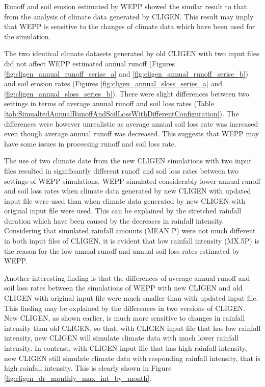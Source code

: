 Runoff and soil erosion estimated by WEPP showed the similar result to that from
the analysis of climate data generated by CLIGEN. This result may imply that
WEPP is sensitive to the changes of climate data which have been used for the
simulation.

The two identical climate datasets generated by old CLIGEN with two input files
did not affect WEPP estimated annual runoff (Figures
\ref{fig:cligen_annual_runoff_serise_a} and
\ref{fig:cligen_annual_runoff_serise_b}) and soil erosion rates (Figures
\ref{fig:cligen_annual_sloss_series_a} and
\ref{fig:cligen_annual_sloss_series_b}).
There were slight differences between two settings in terms of average annual
runoff and soil loss rates (Table
\ref{tab:SimualtedAnnualRunoffAndSoilLossWithDifferentConfiguration}). The
differences were however unrealistic as average annual soil loss rate was
increased even though average annual runoff was decreased. This suggests that
WEPP may have some issues in processing runoff and soil loss rate.

The use of two climate date from the new CLIGEN simulations with two input files
resulted in significantly different runoff and soil loss rates between two
settings of WEPP simulations. WEPP simulated considerably lower annual runoff
and soil loss rates when climate data generated by new CLIGEN with updated input
file were used than when climate data generated by new CLIGEN with original
input file were used. This can be explained by the stretched rainfall duration
which have been caused by the decreases in rainfall intensity. Considering that
simulated rainfall amounts (MEAN P) were not much different in both input files
of CLIGEN, it is evident that low rainfall intensity ({MX.5P}) is the reason for
the low annual runoff and annual soil loss rates estimated by WEPP.

Another interesting finding is that the differences of average annual runoff and
soil loss rates between the simulations of WEPP with new CLIGEN and old CLIGEN
with original input file were much smaller than with updated input file. This
finding may be explained by the differences in two versions of CLIGEN. New
CLIGEN, as shown earlier, is much more sensitive to changes in rainfall
intensity than old CLIGEN, so that, with CLIGEN input file that has low rainfall
intensity, new CLIGEN will simulate climate data with much lower rainfall
intensity. In contrast, with CLIGEN input file that has high rainfall intensity,
new CLIGEN still simulate climate data with responding rainfall intensity, that
is high rainfall intensity. This is clearly shown in Figure
\ref{fig:cligen_dr_monthly_max_int_by_month}.

